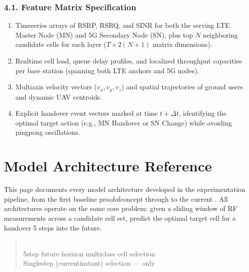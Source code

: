\documentclass[letterpaper,10pt,english]{sphinxmanual}
\begin{document}
\subsection{4.1. Feature Matrix Specification}
\label{\detokenize{dataset:feature-matrix-specification}}\begin{enumerate}
%
\item {} 
\sphinxAtStartPar
{} Time\sphinxhyphen{}series arrays of RSRP, RSRQ, and SINR for both the serving LTE Master Node (MN) and 5G Secondary Node (SN), plus top \(N\) neighboring candidate cells for each layer (\(T \times 2(N+1)\) matrix dimensions).

\item {} 
\sphinxAtStartPar
{} Real\sphinxhyphen{}time cell load, queue delay profiles, and localized throughput capacities per base station (spanning both LTE anchors and 5G nodes).

\item {} 
\sphinxAtStartPar
{} Multi\sphinxhyphen{}axis velocity vectors (\(v_x, v_y, v_z\)) and spatial trajectories of ground users and dynamic UAV centroids.

\item {} 
\sphinxAtStartPar
{} Explicit handover event vectors marked at time \(t + \Delta t\), identifying the optimal target action (e.g., MN Handover or SN Change) while avoiding ping\sphinxhyphen{}pong oscillations.

\end{enumerate}

\sphinxstepscope


\chapter{Model Architecture Reference}
\label{\detokenize{architecture:model-architecture-reference}}\label{\detokenize{architecture::doc}}
\sphinxAtStartPar
This page documents every model architecture developed in the experimentation pipeline, from the first baseline proof\sphinxhyphen{}of\sphinxhyphen{}concept through to the current . All architectures operate on the same core problem: given a sliding window of RF measurements across a candidate cell set, predict the optimal target cell for a handover 5 steps into the future.
\begin{quote}

\sphinxAtStartPar
{} \\
 5\sphinxhyphen{}step future horizon multi\sphinxhyphen{}class cell selection\\
 Single\sphinxhyphen{}step (current\sphinxhyphen{}instant) selection —  only
\end{quote}
\end{document}
